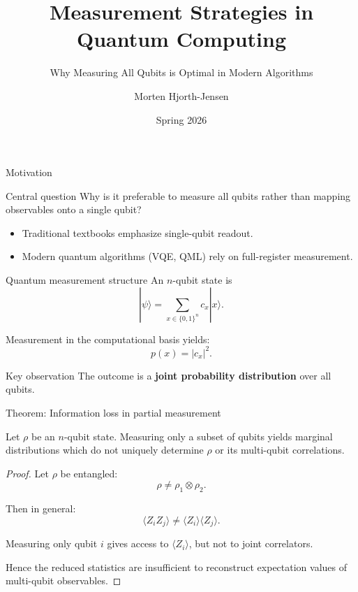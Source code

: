 \documentclass[aspectratio=169]{beamer}
\title{Measurement Strategies in Quantum Computing}
\subtitle{Why Measuring All Qubits is Optimal in Modern Algorithms}
\author{Morten Hjorth-Jensen}
\date{Spring 2026}
\begin{document}
\begin{frame}
\titlepage
\end{frame}


\begin{frame}{Motivation}
\begin{block}{Central question}
Why is it preferable to measure all qubits rather than mapping observables onto a single qubit?
\end{block}

\begin{itemize}
\item Traditional textbooks emphasize single-qubit readout.
\item Modern quantum algorithms (VQE, QML) rely on full-register measurement.
\end{itemize}
\end{frame}


\begin{frame}{Quantum measurement structure}
An $n$-qubit state is
\[
|\psi\rangle = \sum_{x \in \{0,1\}^n} c_x |x\rangle.
\]

Measurement in the computational basis yields:
\[
p(x) = |c_x|^2.
\]

\medskip

\begin{block}{Key observation}
The outcome is a \textbf{joint probability distribution} over all qubits.
\end{block}
\end{frame}


\begin{frame}{Theorem: Information loss in partial measurement}
\begin{theorem}
Let $\rho$ be an $n$-qubit state. Measuring only a subset of qubits yields marginal distributions which do not uniquely determine $\rho$ or its multi-qubit correlations.
\end{theorem}

\begin{proof}
Let $\rho$ be entangled:
\[
\rho \neq \rho_1 \otimes \rho_2.
\]

Then in general:
\[
\langle Z_i Z_j \rangle \neq \langle Z_i \rangle \langle Z_j \rangle.
\]

Measuring only qubit $i$ gives access to $\langle Z_i \rangle$, but not to joint correlators.

Hence the reduced statistics are insufficient to reconstruct expectation values of multi-qubit observables.
\end{proof}
\end{frame}
\end{document}
